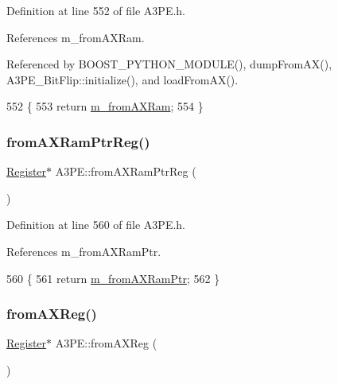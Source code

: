 Definition at line 552 of file A3\+P\+E.\+h.



References m\+\_\+from\+A\+X\+Ram.



Referenced by B\+O\+O\+S\+T\+\_\+\+P\+Y\+T\+H\+O\+N\+\_\+\+M\+O\+D\+U\+L\+E(), dump\+From\+A\+X(), A3\+P\+E\+\_\+\+Bit\+Flip\+::initialize(), and load\+From\+A\+X().


\begin{DoxyCode}
552                   \{
553     \textcolor{keywordflow}{return} \hyperlink{classA3PE_a91d3dd3e87e2c948dd67cb82a63d3858}{m\_fromAXRam};
554   \}
\end{DoxyCode}
\mbox{\label{classA3PE_aad21357e25e3d4e2bed779040de52e13}} 
\subsubsection{\texorpdfstring{from\+A\+X\+Ram\+Ptr\+Reg()}{fromAXRamPtrReg()}}
{\footnotesize\ttfamily \hyperlink{classRegister}{Register}$\ast$ A3\+P\+E\+::from\+A\+X\+Ram\+Ptr\+Reg (\begin{DoxyParamCaption}{ }\end{DoxyParamCaption})\hspace{0.3cm}{\ttfamily [inline]}}



Definition at line 560 of file A3\+P\+E.\+h.



References m\+\_\+from\+A\+X\+Ram\+Ptr.


\begin{DoxyCode}
560                              \{
561     \textcolor{keywordflow}{return} \hyperlink{classA3PE_a27ae9467bc128e46dd80443245df096a}{m\_fromAXRamPtr};
562   \}
\end{DoxyCode}
\mbox{\label{classA3PE_a0b2fabe7e7941f33de210d9385b7afce}} 
\subsubsection{\texorpdfstring{from\+A\+X\+Reg()}{fromAXReg()}}
{\footnotesize\ttfamily \hyperlink{classRegister}{Register}$\ast$ A3\+P\+E\+::from\+A\+X\+Reg (\begin{DoxyParamCaption}{ }\end{DoxyParamCaption})\hspace{0.3cm}{\ttfamily [inline]}}



